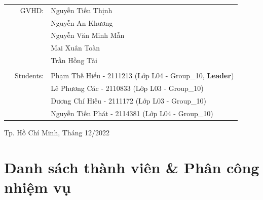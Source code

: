 \documentclass[a4paper]{article}
\begin{document}
\begin{titlepage}
\begin{table}[h]
\begin{tabular}{rrl}
\hspace{5 cm} & GVHD: & Nguyễn Tiến Thịnh\\
\hspace{5 cm} &  & Nguyễn An Khương\\
\hspace{5 cm} &  & Nguyễn Văn Minh Mẫn\\
\hspace{5 cm} &  & Mai Xuân Toàn\\
\hspace{5 cm} &  & Trần Hồng Tài\\
\\
& Students: & Phạm Thế Hiểu - 2111213 (Lớp L04 - Group\_10, \textbf{Leader}) \\
& & Lê Phương Các - 2110833 (Lớp L03 - Group\_10)\\
& & Dương Chí Hiếu - 2111172 (Lớp L03 - Group\_10)\\
& & Nguyễn Tiến Phát - 2114381 (Lớp L04 - Group\_10)\\
\end{tabular}
\end{table}
\vspace{1.5cm}
\begin{center}
{\footnotesize Tp. Hồ Chí Minh, Tháng 12/2022}
\end{center}
\end{titlepage}


\newpage
\tableofcontents
\newpage
\listoffigures
\newpage


\section{Danh sách thành viên \& Phân công nhiệm vụ}
\end{document}
